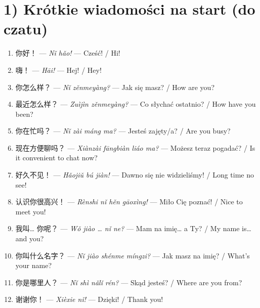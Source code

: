 \documentclass[11pt]{article}
\begin{document}
	
	\section*{1) Krótkie wiadomości na start (do czatu)}
	\begin{enumerate}[label=\arabic*., leftmargin=*, itemsep=4pt]
		\item 你好！ — \textit{Nǐ hǎo!} — Cześć! / Hi!
		\item 嗨！ — \textit{Hāi!} — Hej! / Hey!
		\item 你怎么样？ — \textit{Nǐ zěnmeyàng?} — Jak się masz? / How are you?
		\item 最近怎么样？ — \textit{Zuìjìn zěnmeyàng?} — Co słychać ostatnio? / How have you been?
		\item 你在忙吗？ — \textit{Nǐ zài máng ma?} — Jesteś zajęty/a? / Are you busy?
		\item 现在方便聊吗？ — \textit{Xiànzài fāngbiàn liáo ma?} — Możesz teraz pogadać? / Is it convenient to chat now?
		\item 好久不见！ — \textit{Hǎojiǔ bú jiàn!} — Dawno się nie widzieliśmy! / Long time no see!
		\item 认识你很高兴！ — \textit{Rènshi nǐ hěn gāoxìng!} — Miło Cię poznać! / Nice to meet you!
		\item 我叫… 你呢？ — \textit{Wǒ jiào … nǐ ne?} — Mam na imię… a Ty? / My name is… and you?
		\item 你叫什么名字？ — \textit{Nǐ jiào shénme míngzi?} — Jak masz na imię? / What’s your name?
		\item 你是哪里人？ — \textit{Nǐ shì nǎlǐ rén?} — Skąd jesteś? / Where are you from?
		\item 谢谢你！ — \textit{Xièxie nǐ!} — Dzięki! / Thank you!
	\end{enumerate}
	
\end{document}
